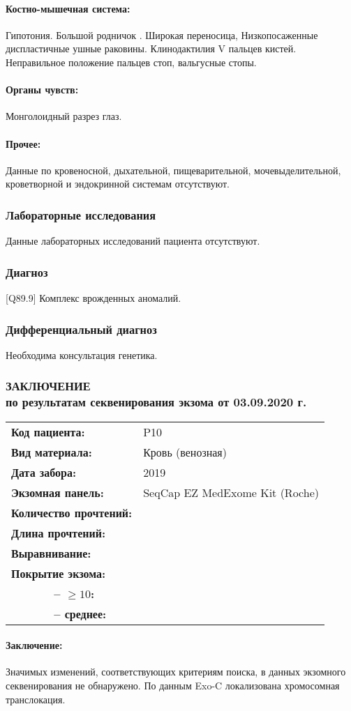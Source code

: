 \documentclass[a4paper,14pt]{extarticle}
\newcommand{\reportgen}[9]{
\begin{tabular}{ >{\bfseries}p{0.35\textwidth} l }
Код пациента: & #1 \\
Вид материала: & #2 \\
Дата забора: & #3 \\
Экзомная панель: & #4 \\
Количество прочтений: & \numprint[\mln]{#5} \\
Длина прочтений: & \numprint[bp]{#6} \\
Выравнивание: & \numprint[\%]{#7} \\
Покрытие экзома: & ~ \\
~~~~~~ -- $\geqslant10$: & \numprint[\%]{#8} \\
~~~~~~ -- среднее: & \numprint[прочтений/позицию]{#9} \\
\end{tabular}}
\newcommand{\mln}{млн}
\newcommand{\cm}{см}
\newcommand{\DS}[2]{[#2] #1}
\begin{document}
\paragraph{Костно-мышечная система:} Гипотония. Большой родничок \numprint[\cm]{1x1}. Широкая переносица, Низкопосаженные диспластичные ушные раковины. Клинодактилия V пальцев кистей. Неправильное положение пальцев стоп, вальгусные стопы.

\paragraph{Органы чувств:} Монголоидный разрез глаз.

\paragraph{Прочее:} Данные по кровеносной, дыхательной, пищеварительной, мочевыделительной, кроветворной и эндокринной системам отсутствуют.

\subsubsection*{Лабораторные исследования}

Данные лабораторных исследований пациента отсутствуют.

\subsubsection*{Диагноз}

\DS{Комплекс врожденных аномалий}{Q89.9}.

\subsubsection*{Дифференциальный диагноз}

Необходима консультация генетика.

\newpage
\subsubsection*{ЗАКЛЮЧЕНИЕ\\по результатам секвенирования экзома от 03.09.2020 г.}

\reportgen{P10}{Кровь (венозная)}{2019}{SeqCap EZ MedExome Kit (Roche)}{81.4}{150}{---}{---}{---}

\paragraph{Заключение:} Значимых изменений, соответствующих критериям поиска, в данных экзомного секвенирования не обнаружено.
По данным Exo-C локализована хромосомная транслокация.
\end{document}
